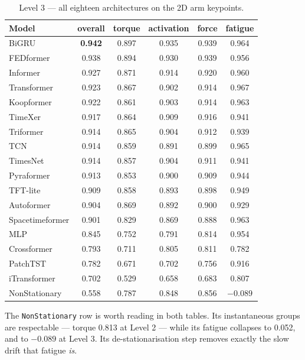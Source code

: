 \begin{table}[H]
\centering
\caption{Level 3 --- all eighteen architectures on the 2D arm keypoints.}
\label{tab:app:l3zoo}
\small
\begin{tabular}{@{}lccccc@{}}
\toprule
\textbf{Model} & \textbf{overall} & \textbf{torque} & \textbf{activation} &
\textbf{force} & \textbf{fatigue} \\
\midrule
BiGRU           & \textbf{0.942} & 0.897 & 0.935 & 0.939 & 0.964 \\
FEDformer       & 0.938 & 0.894 & 0.930 & 0.939 & 0.956 \\
Informer        & 0.927 & 0.871 & 0.914 & 0.920 & 0.960 \\
Transformer     & 0.923 & 0.867 & 0.902 & 0.914 & 0.967 \\
Koopformer      & 0.922 & 0.861 & 0.903 & 0.914 & 0.963 \\
TimeXer         & 0.917 & 0.864 & 0.909 & 0.916 & 0.941 \\
Triformer       & 0.914 & 0.865 & 0.904 & 0.912 & 0.939 \\
TCN             & 0.914 & 0.859 & 0.891 & 0.899 & 0.965 \\
TimesNet        & 0.914 & 0.857 & 0.904 & 0.911 & 0.941 \\
Pyraformer      & 0.913 & 0.853 & 0.900 & 0.909 & 0.944 \\
TFT-lite        & 0.909 & 0.858 & 0.893 & 0.898 & 0.949 \\
Autoformer      & 0.904 & 0.869 & 0.892 & 0.900 & 0.929 \\
Spacetimeformer & 0.901 & 0.829 & 0.869 & 0.888 & 0.963 \\
MLP             & 0.845 & 0.752 & 0.791 & 0.814 & 0.954 \\
Crossformer     & 0.793 & 0.711 & 0.805 & 0.811 & 0.782 \\
PatchTST        & 0.782 & 0.671 & 0.702 & 0.756 & 0.916 \\
iTransformer    & 0.702 & 0.529 & 0.658 & 0.683 & 0.807 \\
NonStationary   & 0.558 & 0.787 & 0.848 & 0.856 & \textbf{$-0.089$} \\
\bottomrule
\end{tabular}
\end{table}

The \texttt{NonStationary} row is worth reading in both tables. Its
instantaneous groups are respectable --- torque \num{0.813} at Level 2 --- while
its fatigue collapses to \num{0.052}, and to $-\num{0.089}$ at Level 3. Its
de-stationarisation step removes exactly the slow drift that fatigue \emph{is}.

